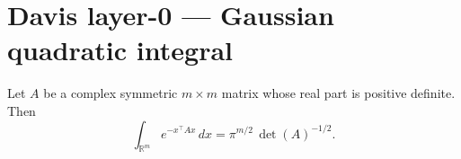 
\chapter{Davis layer-0 — Gaussian quadratic integral}
\label{chap:davis-l0-quadratic}

\begin{lemma}
\label{lem:gaussian-quadratic}
Let $A$ be a complex symmetric $m \times m$ matrix whose real part is
positive definite. Then
\[
  \int_{\mathbb{R}^m} e^{-x^\top A x}\,dx = \pi^{m/2}\,\det(A)^{-1/2}.
\]
\end{lemma}
